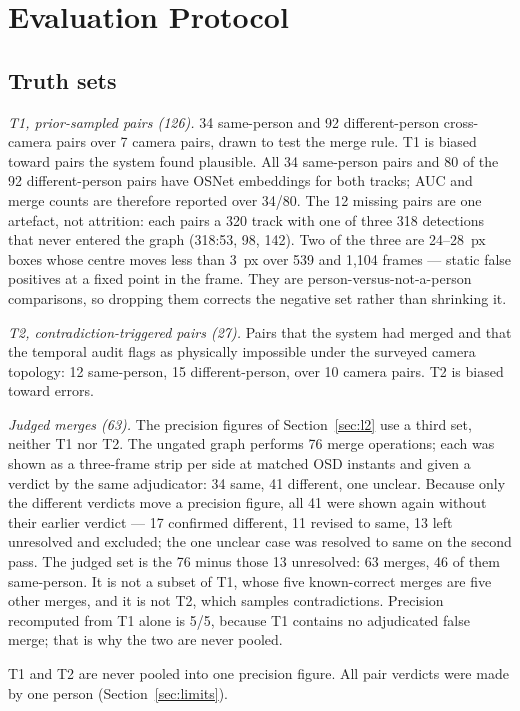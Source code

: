 \documentclass[journal]{IEEEtran}
\begin{document}
\section{Evaluation Protocol}\label{sec:eval}
\subsection{Truth sets}
\emph{T1, prior-sampled pairs (126).} 34 same-person and 92 different-person cross-camera pairs over 7 camera pairs, drawn to test the merge rule. T1 is biased toward pairs the system found plausible. All 34 same-person pairs and 80 of the 92 different-person pairs have OSNet embeddings for both tracks; AUC and merge counts are therefore reported over 34/80. The 12 missing pairs are one artefact, not attrition: each pairs a 320 track with one of three 318 detections that never entered the graph (318:53, 98, 142). Two of the three are 24--28~px boxes whose centre moves less than 3~px over 539 and 1,104 frames --- static false positives at a fixed point in the frame. They are person-versus-not-a-person comparisons, so dropping them corrects the negative set rather than shrinking it.

\emph{T2, contradiction-triggered pairs (27).} Pairs that the system had merged and that the temporal audit flags as physically impossible under the surveyed camera topology: 12 same-person, 15 different-person, over 10 camera pairs. T2 is biased toward errors.

\emph{Judged merges (63).} The precision figures of Section~\ref{sec:l2} use a third set, neither T1 nor T2. The ungated graph performs 76 merge operations; each was shown as a three-frame strip per side at matched OSD instants and given a verdict by the same adjudicator: 34 same, 41 different, one unclear. Because only the different verdicts move a precision figure, all 41 were shown again without their earlier verdict --- 17 confirmed different, 11 revised to same, 13 left unresolved and excluded; the one unclear case was resolved to same on the second pass. The judged set is the 76 minus those 13 unresolved: 63 merges, 46 of them same-person. It is not a subset of T1, whose five known-correct merges are five other merges, and it is not T2, which samples contradictions. Precision recomputed from T1 alone is 5/5, because T1 contains no adjudicated false merge; that is why the two are never pooled.

T1 and T2 are never pooled into one precision figure. All pair verdicts were made by one person (Section~\ref{sec:limits}).
\end{document}
